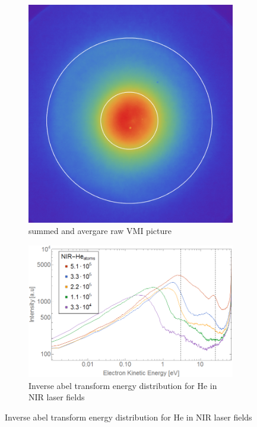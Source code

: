 \begin{figure}[h!]
\centering
\begin{subfigure}[l]{0.4\textwidth}\caption{summed and avergare raw VMI picture}
\includegraphics[width=1\textwidth]{../Images/results/Comparison_energyDistribution/NIr_He_12K.png}   				\end{subfigure}
\begin{subfigure}[l]{0.59\textwidth}\caption{Inverse abel transform energy distribution for He in NIR laser fields}
\includegraphics[width=1\textwidth]{../Images/results/Comparison_energyDistribution/NIR_He_summed_energydist.png} 
\end{subfigure}


\end{figure}
